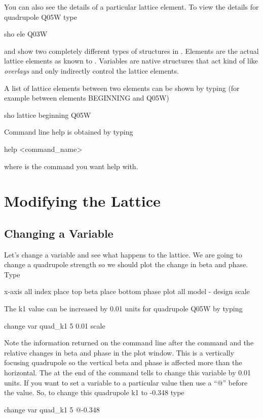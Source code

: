 You can also see the details of a particular lattice element. To view the details
for quadrupole Q05W type
\begin{example}
  sho ele Q03W
\end{example}

 and  show two completely different types of
structures in \tao. Elements are the actual lattice elements as known to \bmad. 
Variables are native \tao structures that act kind of like \bmad
\textit{overlays} and only indirectly control the lattice elements.

A list of lattice elements between two elements can be shown by typing (for
example between elements BEGINNING and Q05W)
\begin{example}
  sho lattice beginning Q05W
\end{example}

Command line help is obtained by typing
\begin{example}
  help <command\_name>
\end{example}
where  is the command you want help with.

\section{Modifying the Lattice}
\label{s:modify_lattice}

\subsection{Changing a Variable}
\label{ss:put_it_back}

Let's change a variable and see what happens to the lattice. We are going to
change a quadrupole strength so we should plot the change in beta and phase.
Type
\begin{example}
  x-axis all index
  place top beta
  place bottom phase
  plot all model - design
  scale
\end{example}

The k1 value can be increased by 0.01 units for quadrupole Q05W by typing
\begin{example}
  change var quad\_k1 5 0.01
  scale
\end{example}
Note the information returned on the command line after the command and the relative changes in
beta and phase in the plot window. This is a vertically focusing quadrupole so
the vertical beta and phase is affected more than the horizontal. The 
at the end of the command tells \tao to change this variable by 0.01 units. If
you want to set a variable to a particular value then use a ``@'' before the
value. So, to change this quadrupole k1 to -0.348 type
\begin{example}
  change var quad\_k1 5 @-0.348
\end{example}

